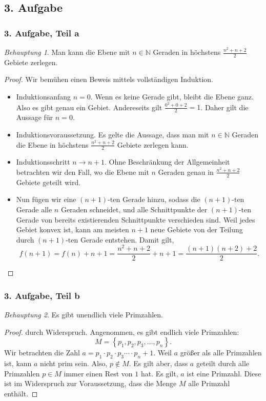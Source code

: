 \documentclass[draft,a5paper]{article}
\theoremstyle{remark}
\newtheorem*{Behauptung}{Behauptung}
\begin{document}
\subsection{3. Aufgabe}
\subsubsection{3. Aufgabe, Teil a}
\begin{Behauptung}
  Man kann die Ebene mit \(n \in \mathbb{N}\) Geraden in höchstens \(\frac{n^{2} + n
    + 2}{2}\) Gebiete zerlegen.
\end{Behauptung}
\begin{proof}
  Wir bemühen einen Beweis mittels vollständigen Induktion.
  \begin{itemize}
  \item   Induktionsanfang \(n = 0\).  Wenn es keine Gerade gibt, bleibt die
    Ebene ganz.  Also es gibt genau ein Gebiet.  Andereseits gilt
    \(\frac{0^2+0+2}{2}=1\).  Daher gilt die Aussage für \(n = 0\).


  \item Induktionsvoraussetzung.  Es gelte die Aussage, dass man mit
    \(n \in \mathbb{N}\) Geraden die Ebene in höchstens
    \(\frac{n^2+n+2}{2}\) Gebiete zerlegen kann.

  \item   Induktionsschritt \(n \rightarrow n+1\).  Ohne Beschränkung der Allgemeinheit
    betrachten wir den Fall, wo die Ebene mit \(n\) Geraden genau in
    \(\frac{n^2+n+2}{2}\) Gebiete geteilt wird.

  \item   Nun fügen wir eine \((n+1)\)-ten Gerade hinzu, sodass die \((n+1)\)-ten
    Gerade alle \(n\) Geraden schneidet, und alle Schnittpunkte der
    \((n+1)\)-ten Gerade von bereits existierenden Schnittpunkte
    verschieden sind.  Weil jedes Gebiet konvex ist, kann am meisten
    \(n+1\) neue Gebiete von der Teilung durch \((n+1)\)-ten Gerade
    entstehen.  Damit gilt,
    \[f(n+1)=f(n)+n+1=\frac{n^2+n+2}{2}+n+1=\frac{(n+1)(n+2)+2}{2}.\]
  \end{itemize}
\end{proof}
\subsubsection{3. Aufgabe, Teil b}
\begin{Behauptung}
  Es gibt unendlich viele Primzahlen.
\end{Behauptung}
\begin{proof}
  durch Widerspruch.  Angenommen, es gibt endlich viele Primzahlen:
  \[M= \left\{ p_1, p_2, p_3, \ldots, p_n \right\}.\]  Wir betrachten die
  Zahl \(a=p_1\cdot p_2 \cdot p_3 \cdots \cdot p_n+1\).  Weil \(a\) größer als alle
  Primzahlen ist, kann \(a\) nicht prim sein.  Also, \(p \notin M\).  Es gilt
  aber, dass \(a\) geteilt durch alle Primzahlen \(p \in M\) immer einen
  Rest von \(1\) hat.  Es gilt, \(a\) ist eine Primzahl.  Diese ist im
  Widerspruch zur Voraussetzung, dass die Menge \(M\) alle Primzahl
  enthält.
\end{proof}
\newpage
\end{document}
